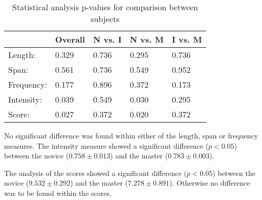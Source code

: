 \begin{table}[h]
	\begin{tabular}{|l|l|l|l|l|}
		\hline
		& Overall & N vs. I & N vs. M & I vs. M \\ \hline
		Length:    & 0.329   & 0.736   & 0.295   & 0.736   \\ \hline
		Span:      & 0.561   & 0.736   & 0.549   & 0.952   \\ \hline
		Frequency: & 0.177   & 0.896   & 0.372   & 0.173   \\ \hline
		Intensity: & 0.039   & 0.549   & 0.030   & 0.295   \\ \hline
		Score:     & 0.027   & 0.372   & 0.020   & 0.372   \\ \hline
	\end{tabular}
	\caption{Statistical analysis p-values for comparison between subjects}
	\label{tab:pValues}
\end{table}

No significant difference was found within either of the length, span or frequency measures. The intensity measure showed a significant difference ($p<0.05$) between the novice ($0.758 \pm 0.013$) and the master ($0.783 \pm 0.003$).

The analysis of the scores showed a significant difference ($p<0.05$) between the novice ($9.532 \pm 0.292$) and the master ($7.278 \pm 0.891$). Otherwise no difference was to be found within the scores.

